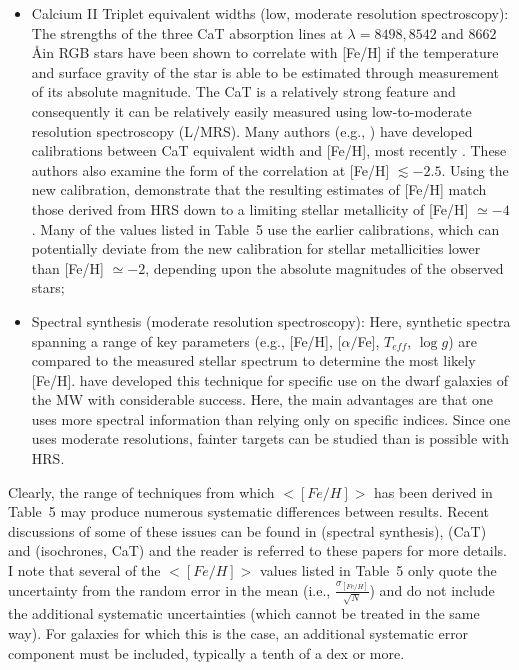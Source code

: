 \documentclass[manuscript]{aastex}
\begin{document}
\begin{itemize}
\item Calcium II Triplet equivalent widths (low, moderate resolution
  spectroscopy): The strengths of the three CaT absorption lines at
  $\lambda = 8498, 8542$ and $8662$\,\AA in RGB stars have been shown to
  correlate with [Fe/H] if the temperature and surface gravity of the
  star is able to be estimated through measurement of its absolute
  magnitude. The CaT is a relatively strong feature and consequently it
  can be relatively easily measured using low-to-moderate resolution
  spectroscopy (L/MRS). Many authors (e.g., \citealt{rutledge1997}) have
  developed calibrations between CaT equivalent width and
  [Fe/H], most recently \cite{starkenburg2010}. These authors also
  examine the form of the correlation at [Fe/H] $\lesssim -2.5$. Using
  the new calibration, \cite{starkenburg2010} demonstrate that the resulting
  estimates of [Fe/H] match those derived from HRS down to a limiting
  stellar metallicity of [Fe/H] $\simeq -4$. Many of the values listed in
  Table~5 use the earlier calibrations, which can potentially deviate from the new
  calibration for stellar metallicities lower than [Fe/H] $\simeq -2$,
  depending upon the absolute magnitudes of the observed stars;

\item Spectral synthesis (moderate resolution spectroscopy):
  Here, synthetic spectra spanning a range of key parameters (e.g.,
  [Fe/H], [$\alpha/$Fe], $T_{eff}$, $\log{g}$) are compared to the
  measured stellar spectrum to determine the most likely
  [Fe/H]. \cite{kirby2008a} have developed this technique for specific
  use on the dwarf galaxies of the MW with considerable success. Here,
  the main advantages are that one uses more spectral information than
  relying only on specific indices. Since one uses moderate
  resolutions, fainter targets can be studied than is possible with HRS.

\end{itemize}

Clearly, the range of techniques from which $<[Fe/H]>$ has been
derived in Table~5 may produce numerous systematic differences between
results. Recent discussions of some of these issues can be found in
\cite{kirby2008a} (spectral synthesis), \cite{starkenburg2010} (CaT)
and \cite{lianou2011} (isochrones, CaT) and the reader is referred to
these papers for more details. I note that several of the $<[Fe/H]>$
values listed in Table~5 only quote the uncertainty from the random
error in the mean (i.e., $\frac{\sigma_{[Fe/H]}}{\sqrt{N}}$) and do
not include the additional systematic uncertainties (which cannot be
treated in the same way). For galaxies for which this is the case, an
additional systematic error component must be included, typically a
tenth of a dex or more.
\end{document}
